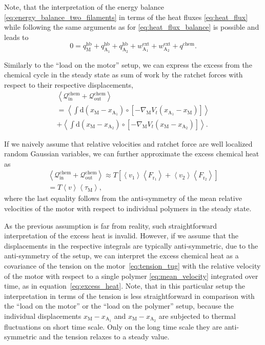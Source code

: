 \documentclass[aps,pre,twocolumn,showpacs,showkeys,superscriptaddress,floatfix]{revtex4-1}
\newcommand{\rmd}{{\mathrm d}}
\begin{document}
Note, that the interpretation of the energy balance \eqref{eq:energy_balance_two_filaments} in terms of the heat fluxes \eqref{eq:heat_flux}
while following the same arguments as for \eqref{eq:heat_flux_balance} is possible and leads to   
\[
0 = q_\text{M}^\text{hb} + q_{\text{A}_1}^\text{hb} + q_{\text{A}_2}^\text{hb} + w^\text{ext}_{\text{A}_1} + w^\text{ext}_{\text{A}_2} + q^\text{chem} .
\]

Similarly to the ``load on the motor'' setup, we can express the excess from the chemical cycle in the steady state as sum of work by the ratchet forces with respect to their respective displacements,
\begin{multline}
\left\langle 
{\mathcal Q}_\text{in}^\text{chem} + {\mathcal Q}_\text{out}^\text{chem} 
\right\rangle 
\\
= 
\left\langle 
\int \rmd \left( x_\text{M} - x_{\text{A}_1} \right) \circ \left[ - \nabla_\text{M} V_t( x_{\text{A}_1} - x_\text{M} ) \right]
\right\rangle 
\\
+
\left\langle 
\int \rmd \left( x_\text{M} - x_{\text{A}_2} \right) \circ \left[ - \nabla_\text{M} V_t( x_\text{M} - x_{\text{A}_2} ) \right]
\right\rangle .
\label{eq:excess_heat_tug}
\end{multline}
 
If we naively assume that relative velocities and ratchet force are well localized random Gaussian variables, 
we can further approximate the excess chemical heat as 
\begin{multline*}
\left\langle 
{\mathcal Q}_\text{in}^\text{chem} + {\mathcal Q}_\text{out}^\text{chem} 
\right\rangle 
\approx T \left[ 
\left\langle v_1 \right\rangle \left\langle F_{\text{r}_1} \right\rangle  
+
\left\langle v_2 \right\rangle \left\langle F_{\text{r}_2} \right\rangle  
\right]
\\
= T \left\langle v \right\rangle \left\langle \tau_\text{M} \right\rangle
, 
\end{multline*}
where the last equality follows from the anti-symmetry of the mean relative velocities of the motor with respect to individual polymers in the steady state. 

As the previous assumption is far from reality, such straightforward interpretation of the excess heat is invalid. 
However, if we assume that the displacements in the respective integrals are typically anti-symmetric, due to the anti-symmetry of the setup, 
we can interpret the excess chemical heat as a covariance of the tension on the motor~\eqref{eq:tension_tug} with the relative velocity of the motor with respect to a single polymer \eqref{eq:mean_velocity} integrated over time, 
as in equation~\eqref{eq:excess_heat}. 
Note, that in this particular setup the interpretation in terms of the tension is less straightforward in comparison with the ``load on the motor'' or the ``load on the polymer'' setup, 
because the individual displacements $x_\text{M} - x_{\text{A}_1}$ and $x_\text{M} - x_{\text{A}_2}$ are subjected to thermal fluctuations on short time scale. 
Only on the long time scale they are anti-symmetric and the tension relaxes to a steady value.  
\end{document}
